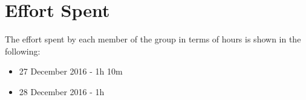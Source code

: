 \section{Effort Spent}

The effort spent by each member of the group in terms of hours is shown in the following:

\begin{itemize}
	\item 27 December 2016 - 1h 10m
	\item 28 December 2016 - 1h
\end{itemize}

